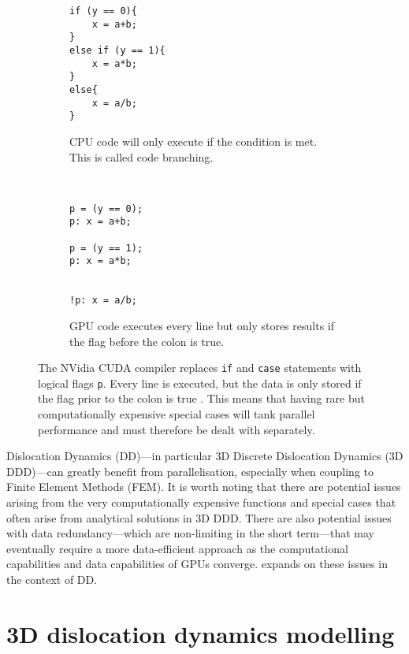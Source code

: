 \begin{figure}
    \centering
    \begin{subfigure}[t]{0.48\linewidth}
        \centering
        \begin{verbatim}
if (y == 0){
    x = a+b;
}
else if (y == 1){
    x = a*b;
}
else{
    x = a/b;
}
			\end{verbatim}
        \caption{CPU code will only execute if the condition is met. This is called code branching.}
    \end{subfigure}
    ~
    \begin{subfigure}[t]{0.48\linewidth}
        \centering
        \begin{verbatim}
p = (y == 0);
p: x = a+b;

p = (y == 1);
p: x = a*b;


!p: x = a/b;
			\end{verbatim}
        \vspace{12pt}
        \caption{GPU code executes every line but only stores results if the flag before the colon is true.}
    \end{subfigure}
    \caption[Explanation of warp divergence.]{The NVidia CUDA compiler replaces \texttt{if} and \texttt{case} statements with logical flags \texttt{p}. Every line is executed, but the data is only stored if the flag prior to the colon is true \cite{nvidia}. This means that having rare but computationally expensive special cases will tank parallel performance and must therefore be dealt with separately.}
    \label{f:code_branching}
\end{figure}

Dislocation Dynamics (DD)---in particular 3D Discrete Dislocation Dynamics (3D DDD)---can greatly benefit from parallelisation, especially when coupling to Finite Element Methods (FEM). It is worth noting that there are potential issues arising from the very computationally expensive functions and special cases that often arise from analytical solutions in 3D DDD. There are also potential issues with data redundancy---which are non-limiting in the short term---that may eventually require a more data-efficient approach as the computational capabilities and data capabilities of GPUs converge.  expands on these issues in the context of DD.

\section{3D dislocation dynamics modelling}
\label{s:3d_ddd}

